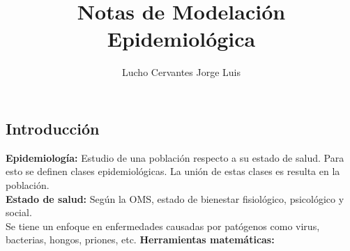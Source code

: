 \documentclass[10pt,oneside]{article}
\title{\textbf{Notas de Modelación Epidemiológica}}
\author{Lucho Cervantes Jorge Luis}
\begin{document}
\maketitle

\begin{multicols}{2}

    \section{Introducción}
    
    \textbf{Epidemiología:} Estudio de una población respecto a su estado de salud. Para esto se definen clases epidemiológicas. La unión de estas clases es resulta en la población. \\ \newline \textbf{Estado de salud:} Según la OMS, estado de bienestar fisiológico, psicológico y social. \\ \newline Se tiene un enfoque en enfermedades causadas por patógenos como virus, bacterias, hongos, priones, etc.
    \textbf{Herramientas matemáticas:}
    

\end{multicols}
\end{document}
